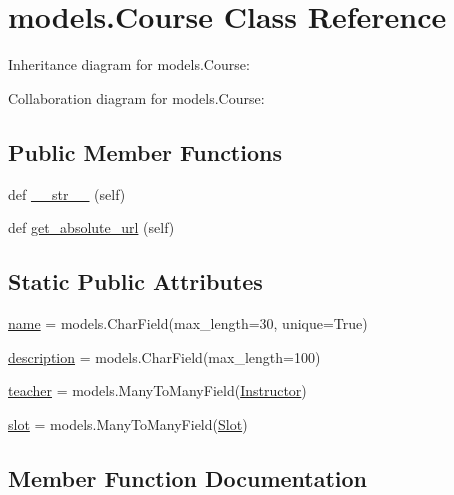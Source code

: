 \hypertarget{classmodels_1_1_course}{}\section{models.\+Course Class Reference}
\label{classmodels_1_1_course}


Inheritance diagram for models.\+Course\+:


Collaboration diagram for models.\+Course\+:
\subsection*{Public Member Functions}
\begin{DoxyCompactItemize}
\item 
def \hyperlink{classmodels_1_1_course_acc64e338b1a64efea3a2701f6aa689ae}{\+\_\+\+\_\+str\+\_\+\+\_\+} (self)
\item 
def \hyperlink{classmodels_1_1_course_a0cbedfae72ead97710ed0be57521f964}{get\+\_\+absolute\+\_\+url} (self)
\end{DoxyCompactItemize}
\subsection*{Static Public Attributes}
\begin{DoxyCompactItemize}
\item 
\hyperlink{classmodels_1_1_course_a4b8a4fdabc8a2f86a43656880362f660}{name} = models.\+Char\+Field(max\+\_\+length=30, unique=True)
\item 
\hyperlink{classmodels_1_1_course_ab197e537089d51e5ea68f2963cf97bfd}{description} = models.\+Char\+Field(max\+\_\+length=100)
\item 
\hyperlink{classmodels_1_1_course_a2f4f8f2e0bb55a8304baa843f5e0cbc0}{teacher} = models.\+Many\+To\+Many\+Field(\hyperlink{classmodels_1_1_instructor}{Instructor})
\item 
\hyperlink{classmodels_1_1_course_a0eeef35d1646b968dae5758f9e3c526a}{slot} = models.\+Many\+To\+Many\+Field(\hyperlink{classmodels_1_1_slot}{Slot})
\end{DoxyCompactItemize}


\subsection{Member Function Documentation}
